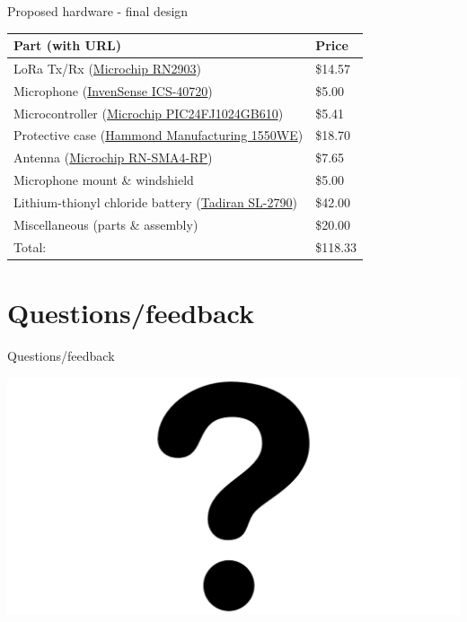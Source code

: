 \documentclass{beamer}
\newcommand{\myhref}[2]{{\color{blue}\href{#1}{#2}}}
\begin{document}
    \begin{frame}{Proposed hardware - final design}
    \smallskip \\ 
        {\footnotesize{\begin{center}
        \begin{tabular}{|l|l|} \hline 
            {\bf Part (with URL)} & {\bf Price} \\ \hline 
            LoRa Tx/Rx (\myhref{http://www.microchip.com/wwwproducts/en/RN2903}{Microchip RN2903}) & \$14.57 \\ 
            \hline Microphone (\myhref{https://www.invensense.com/products/analog/ics-40720/}{InvenSense ICS-40720}) & \$5.00 \\ \hline 
            Microcontroller (\myhref{http://www.microchip.com/wwwproducts/en/PIC24FJ1024GB610}{Microchip PIC24FJ1024GB610}) & \$5.41 \\ \hline
            Protective case (\myhref{https://www.digikey.ca/product-detail/en/hammond-manufacturing/1550WE/HM1214-ND/2211564}{Hammond Manufacturing 1550WE}) & \$18.70 \\ \hline 
            Antenna (\myhref{https://www.digikey.ca/product-detail/en/microchip-technology/RN-SMA4-RP/740-1033-ND/2207396}{Microchip RN-SMA4-RP}) & \$7.65 \\ \hline Microphone mount \& windshield & \$5.00 \\ \hline
            Lithium-thionyl chloride battery (\myhref{http://www.tadiranbatteries.de/pdf/lithium-thionyl-chloride-batteries/SL-2790.pdf}{Tadiran SL-2790}) & \$42.00 \\ \hline Miscellaneous (parts \& assembly) & \$20.00 \\ \hline  
            Total: & \$118.33 \\ \hline 
        \end{tabular}
        \end{center}}}
    \end{frame}
    
\section{Questions/feedback}

    \begin{frame}{Questions/feedback}
        \begin{center}
            \includegraphics[scale=0.2]{figures/36601.png}
        \end{center}
    \end{frame}
\end{document}
